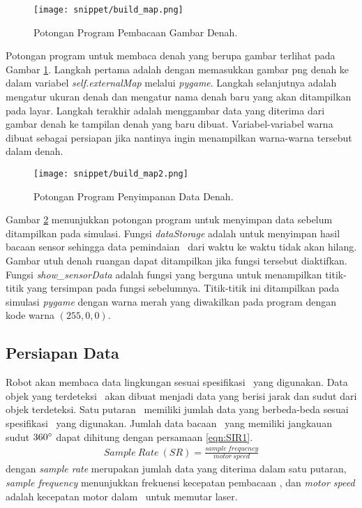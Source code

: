 \begin{figure}[H]
    \centering
    \texttt{[image: snippet/build\_map.png]}
    \caption{Potongan Program Pembacaan Gambar Denah.}
    \label{fig:Ch04_program_denah}
\end{figure}

Potongan program untuk membaca denah yang berupa gambar terlihat pada Gambar \ref{fig:Ch04_program_denah}. Langkah pertama adalah dengan memasukkan gambar png denah ke dalam variabel \textit{self.externalMap} melalui \textit{pygame}. Langkah selanjutnya adalah mengatur ukuran denah dan mengatur nama denah baru yang akan ditampilkan pada layar. Langkah terakhir adalah menggambar data yang diterima dari gambar denah ke tampilan denah yang baru dibuat. Variabel-variabel warna dibuat sebagai persiapan jika nantinya ingin menampilkan warna-warna tersebut dalam denah.
\begin{figure}[H]
    \centering
    \texttt{[image: snippet/build\_map2.png]}
    \caption{Potongan Program Penyimpanan Data Denah.}
    \label{fig:Ch04_program_denah2}
\end{figure}

Gambar \ref{fig:Ch04_program_denah2} menunjukkan potongan program untuk menyimpan data sebelum ditampilkan pada simulasi. Fungsi \textit{dataStorage} adalah untuk menyimpan hasil bacaan sensor sehingga data pemindaian \lidar\ dari waktu ke waktu tidak akan hilang. Gambar utuh denah ruangan dapat ditampilkan jika fungsi tersebut diaktifkan. Fungsi \textit{show\_sensorData} adalah fungsi yang berguna untuk menampilkan titik-titik yang tersimpan pada fungsi sebelumnya. Titik-titik ini ditampilkan pada simulasi \textit{pygame} dengan warna merah yang diwakilkan pada program dengan kode warna $(255,0,0)$. 


\subsection{Persiapan Data \lidar}
\label{sec:Persiapan2}

Robot akan membaca data lingkungan sesuai spesifikasi \lidar\ yang digunakan. Data objek yang terdeteksi \lidar\ akan dibuat menjadi data yang berisi jarak dan sudut dari objek terdeteksi. Satu putaran \lidar\ memiliki jumlah data yang berbeda-beda sesuai spesifikasi \lidar\ yang digunakan. Jumlah data bacaan \lidar\ yang memiliki jangkauan sudut $360 \degree$ dapat dihitung dengan persamaan \ref*{eqn:SIR1}.
    \begin{align}
        \label{eqn:SIR1}
        Sample\ Rate\ (SR) = \frac{sample\ frequency}{motor\ speed}
    \end{align}
dengan \textit{sample rate} merupakan jumlah data yang diterima dalam satu putaran, \textit{sample frequency} menunjukkan frekuensi kecepatan pembacaan \lidar, dan \textit{motor speed} adalah kecepatan motor dalam \lidar\ untuk memutar laser. 

